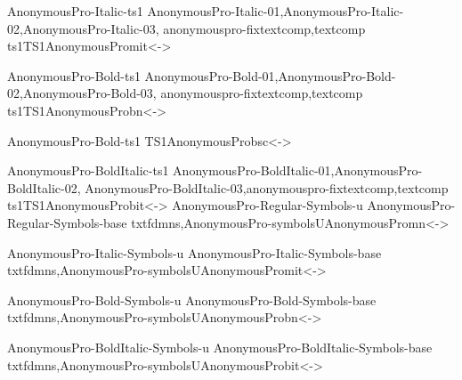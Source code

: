 \installfont
  {AnonymousPro-Italic-ts1}%
  {AnonymousPro-Italic-01,AnonymousPro-Italic-02,AnonymousPro-Italic-03,%
    anonymouspro-fixtextcomp,textcomp}%
  {ts1}{TS1}{AnonymousPro}{m}{it}{<->\string\ANP@@scale}

\installfont
  {AnonymousPro-Bold-ts1}%
  {AnonymousPro-Bold-01,AnonymousPro-Bold-02,AnonymousPro-Bold-03,%
    anonymouspro-fixtextcomp,textcomp}%
  {ts1}{TS1}{AnonymousPro}{b}{n}{<->\string\ANP@@scale}

\installfontas
  {AnonymousPro-Bold-ts1}%
  {TS1}{AnonymousPro}{b}{sc}{<->\string\ANP@@scale}

\installfont
  {AnonymousPro-BoldItalic-ts1}%
  {AnonymousPro-BoldItalic-01,AnonymousPro-BoldItalic-02,%
    AnonymousPro-BoldItalic-03,anonymouspro-fixtextcomp,textcomp}%
  {ts1}{TS1}{AnonymousPro}{b}{it}{<->\string\ANP@@scale}
\endinstallfonts
\installfonts
{}
\installfont
  {AnonymousPro-Regular-Symbols-u}%
  {AnonymousPro-Regular-Symbols-base}%
  {txtfdmns,AnonymousPro-symbols}{U}{AnonymousPro}{m}{n}{<->\string\ANP@@scale}

\installfont
  {AnonymousPro-Italic-Symbols-u}%
  {AnonymousPro-Italic-Symbols-base}%
  {txtfdmns,AnonymousPro-symbols}{U}{AnonymousPro}{m}{it}{<->\string\ANP@@scale}

\installfont
  {AnonymousPro-Bold-Symbols-u}%
  {AnonymousPro-Bold-Symbols-base}%
  {txtfdmns,AnonymousPro-symbols}{U}{AnonymousPro}{b}{n}{<->\string\ANP@@scale}

\installfont
  {AnonymousPro-BoldItalic-Symbols-u}%
  {AnonymousPro-BoldItalic-Symbols-base}%
  {txtfdmns,AnonymousPro-symbols}{U}{AnonymousPro}{b}{it}{<->\string\ANP@@scale}
\endinstallfonts
\endrecordtransforms
\bye
\endinput

